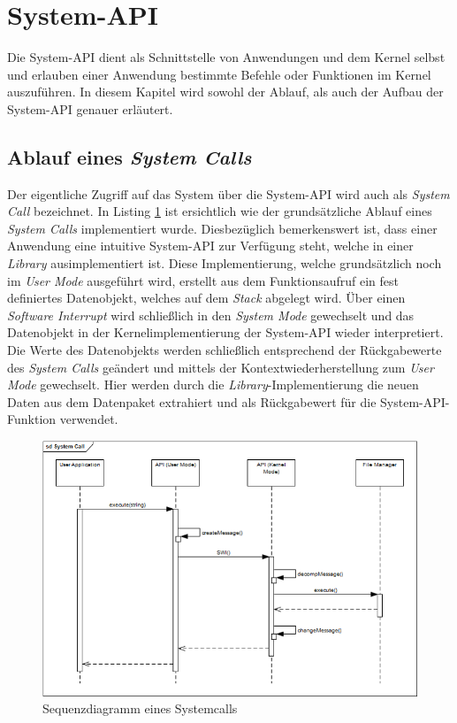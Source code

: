 \section{System-API}
\label{chapAPI}
Die System-API dient als Schnittstelle von Anwendungen und dem Kernel selbst und erlauben einer Anwendung bestimmte Befehle oder Funktionen im Kernel auszuführen. In diesem Kapitel wird sowohl der Ablauf, als auch der Aufbau der System-API genauer erläutert.

\subsection{Ablauf eines \textit{System Calls}}
Der eigentliche Zugriff auf das System über die System-API wird auch als \textit{System Call} bezeichnet. In Listing \ref{fig:Sequencediagram-systemcall} ist ersichtlich wie der grundsätzliche Ablauf eines \textit{System Calls} implementiert wurde. Diesbezüglich bemerkenswert ist, dass einer Anwendung eine intuitive System-API zur Verfügung steht, welche in einer \textit{Library} ausimplementiert ist. Diese Implementierung, welche grundsätzlich noch im \textit{User Mode} ausgeführt wird, erstellt aus dem Funktionsaufruf ein fest definiertes Datenobjekt, welches auf dem \textit{Stack} abgelegt wird. Über einen \textit{Software Interrupt} wird schließlich in den \textit{System Mode} gewechselt und das Datenobjekt in der Kernelimplementierung der System-API wieder interpretiert. Die Werte des Datenobjekts werden schließlich entsprechend der Rückgabewerte des \textit{System Calls} geändert und mittels der Kontextwiederherstellung zum \textit{User Mode} gewechselt. Hier werden durch die \textit{Library}-Implementierung die neuen Daten aus dem Datenpaket extrahiert und als Rückgabewert für die System-API-Funktion verwendet.

\begin{figure}[H]
	\includegraphics[scale=0.60]{chapters/systemapi/figures/systemcall-sequence-diagram}
	\caption{Sequenzdiagramm eines Systemcalls}
	\label{fig:Sequencediagram-systemcall}
\end{figure}

